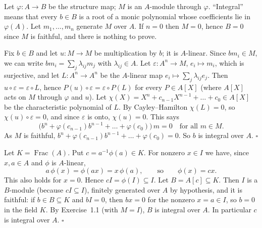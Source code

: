\documentclass[11pt]{article}
\begin{document}
\pf
Let $\varphi:A\to B$ be the structure map; $M$ is an $A$-module through $\varphi$. ``Integral'' means that every $b\in B$ is a root of a monic polynomial whose coefficients lie in $\varphi(A)$. Let $m_1,\dots,m_n$ generate $M$ over $A$. If $n=0$ then $M=0$, hence $B=0$ since $M$ is faithful, and there is nothing to prove.

Fix $b\in B$ and let $u:M\to M$ be multiplication by $b$; it is $A$-linear. Since $bm_i\in M$, we can write $bm_i=\sum_j\lambda_{ij}m_j$ with $\lambda_{ij}\in A$. Let $\varepsilon:A^n\to M$, $e_i\mapsto m_i$, which is surjective, and let $L:A^n\to A^n$ be the $A$-linear map $e_i\mapsto\sum_j\lambda_{ij}e_j$. Then $u\circ\varepsilon=\varepsilon\circ L$, hence $P(u)\circ\varepsilon=\varepsilon\circ P(L)$ for every $P\in A[X]$ (where $A[X]$ acts on $M$ through $\varphi$ and $u$). Let $\chi(X)=X^n+c_{n-1}X^{n-1}+\dots+c_0\in A[X]$ be the characteristic polynomial of $L$. By Cayley--Hamilton $\chi(L)=0$, so $\chi(u)\circ\varepsilon=0$, and since $\varepsilon$ is onto, $\chi(u)=0$. This says
\[ \bigl(b^n+\varphi(c_{n-1})b^{n-1}+\dots+\varphi(c_0)\bigr)\,m=0\quad\text{for all }m\in M. \]
As $M$ is faithful, $b^n+\varphi(c_{n-1})b^{n-1}+\dots+\varphi(c_0)=0$. So $b$ is integral over $A$. \hfill$\square$

\pf
Let $K=\operatorname{Frac}(A)$. Put $c=a^{-1}\phi(a)\in K$. For nonzero $x\in I$ we have, since $x,a\in A$ and $\phi$ is $A$-linear,
\[ a\,\phi(x)=\phi(ax)=x\,\phi(a),\qquad\text{so}\qquad \phi(x)=cx. \]
This also holds for $x=0$. Hence $cI=\phi(I)\subseteq I$. Let $B=A[c]\subseteq K$. Then $I$ is a $B$-module (because $cI\subseteq I$), finitely generated over $A$ by hypothesis, and it is faithful: if $b\in B\subseteq K$ and $bI=0$, then $bx=0$ for the nonzero $x=a\in I$, so $b=0$ in the field $K$. By Exercise~1.1 (with $M=I$), $B$ is integral over $A$. In particular $c$ is integral over $A$. \hfill$\square$
\end{document}

